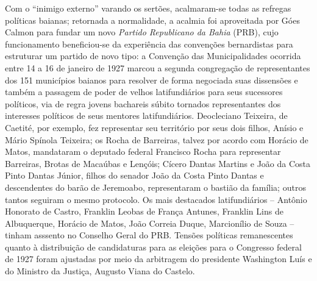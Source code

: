 Com o ``inimigo externo'' varando os sertões, acalmaram-se todas as refregas políticas baianas; retornada a normalidade, a acalmia foi aproveitada por Góes Calmon para fundar um novo \textit{Partido Republicano da Bahia} (PRB), cujo funcionamento beneficiou-se da experiência das convenções bernardistas para estruturar um partido de novo tipo: a Convenção das Municipalidades ocorrida entre 14 a 16 de janeiro de 1927 marcou a segunda congregação de representantes dos 151 municípios baianos para resolver de forma negociada suas dissensões e também a passagem de poder de velhos latifundiários para seus sucessores políticos, via de regra jovens bachareis súbito tornados representantes dos interesses políticos de seus mentores latifundiários. Deocleciano Teixeira, de Caetité, por exemplo, fez representar seu território por seus dois filhos, Anísio e Mário Spínola Teixeira; os Rocha de Barreiras, talvez por acordo com Horácio de Matos, mandataram o deputado federal Francisco Rocha para representar Barreiras, Brotas de Macaúbas e Lençóis; Cícero Dantas Martins e João da Costa Pinto Dantas Júnior, filhos do senador João da Costa Pinto Dantas e descendentes do barão de Jeremoabo, representaram o bastião da família; outros tantos seguiram o mesmo protocolo. Os mais destacados latifundiários -- Antônio Honorato de Castro, Franklin Leobas de França Antunes, Franklin Lins de Albuquerque, Horácio de Matos, João Correia Duque, Marcionílio de Souza -- tinham asssento no Conselho Geral do PRB. Tensões políticas remanescentes quanto à distribuição de candidaturas para as eleições para o Congresso federal de 1927 foram ajustadas por meio da arbitragem do presidente Washington Luís e do Ministro da Justiça, Augusto Viana do Castelo.

